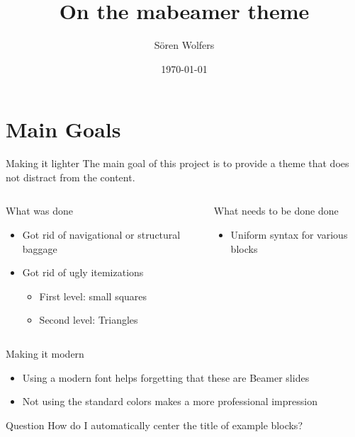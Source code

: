 \documentclass[12pt]{beamer}
\title{On the mabeamer theme}
\date{\today}%
\author[S. Wolfers]{Sören Wolfers}
\begin{document}
\frame{\maketitle}
\matableofcontents
\section{Main Goals}
\begin{frame}{Making it lighter}
The main goal of this project is to provide a theme that does not distract from the content.
\begin{columns}
	\begin{column}{0.5\textwidth}	
		\begin{block}{What  was done}
		\begin{itemize}
		\item Got rid of navigational or structural baggage
		\item Got rid of ugly itemizations
		\begin{itemize}
		\item First level: small squares
		\item Second level: Triangles
		\end{itemize}
		\end{itemize}
		\end{block}
	\end{column}
	\begin{column}{0.5\textwidth}
		\begin{block}{What  needs to be done done}
		\begin{itemize}
			\item Uniform syntax for various blocks
		\end{itemize}
		\end{block}
	\end{column}
\end{columns}
\end{frame}

\begin{frame}{Making it modern}
\begin{itemize}
	\item Using a modern font helps forgetting that these are Beamer slides

	\item Not using {\color{yellow}the} {\color{blue}standard} {\color{red}colors} makes a more professional impression
\end{itemize}

\begin{exampleblock}{\centering Question}
How do I automatically center the title of example blocks?
\end{exampleblock}
\end{frame}
\end{document}
